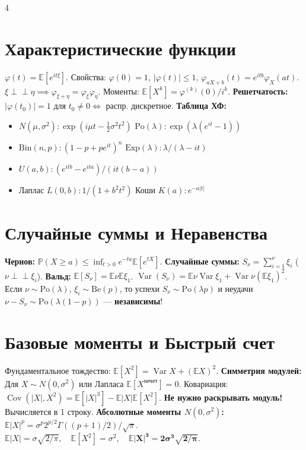 \documentclass[8pt, a4paper, landscape]{extarticle}
\newcommand{\E}{\mathbb{E}}
\renewcommand{\P}{\mathbb{P}}
\DeclareMathOperator{\Var}{Var}
\DeclareMathOperator{\Cov}{Cov}
\begin{document}
\begin{multicols*}{4}
\section*{Характеристические функции}
$\varphi(t) = \E[e^{it\xi}]$. Свойства: $\varphi(0)=1$, $|\varphi(t)| \le 1$, $\varphi_{aX+b}(t) = e^{itb}\varphi_X(at)$.
$\xi \perp\!\!\perp \eta \implies \varphi_{\xi+\eta} = \varphi_\xi \varphi_\eta$. Моменты: $\E[X^k] = \varphi^{(k)}(0) / i^k$.
\textbf{Решетчатость:} $|\varphi(t_0)|=1$ для $t_0 \ne 0 \iff$ распр. дискретное.
\textbf{Таблица ХФ:}
\begin{itemize}
    \item $N(\mu,\sigma^2): \exp(i\mu t - \frac{1}{2}\sigma^2 t^2)$ \quad $\text{Po}(\lambda): \exp(\lambda(e^{it}-1))$
    \item $\text{Bin}(n,p): (1-p+pe^{it})^n$ \quad $\text{Exp}(\lambda): \lambda / (\lambda-it)$
    \item $U(a,b): (e^{itb}-e^{ita}) / (it(b-a))$
    \item Лаплас $L(0,b): 1 / (1+b^2 t^2)$ \quad Коши $K(a): e^{-a|t|}$
\end{itemize}

\section*{Случайные суммы и Неравенства}
\textbf{Чернов:} $\P(X \ge a) \le \inf_{t>0} e^{-ta}\E[e^{tX}]$.
\textbf{Случайные суммы:} $S_\nu = \sum_{i=1}^\nu \xi_i$ ($\nu \perp\!\!\perp \xi_i$).
\textbf{Вальд:} $\E[S_\nu] \!=\! \E\nu\E\xi_1$. $\Var(S_\nu) \!=\! \E\nu\Var\xi_1 \!+\! \Var\nu(\E\xi_1)^2$.
Если $\nu \sim \text{Po}(\lambda)$, $\xi_i \sim \text{Be}(p)$, то успехи $S_\nu \sim \text{Po}(\lambda p)$ и неудачи $\nu-S_\nu \sim \text{Po}(\lambda(1-p))$ --- \textbf{независимы}!

\section*{Базовые моменты и Быстрый счет}
Фундаментальное тождество: $\E[X^2] = \Var X + (\E X)^2$. 
\textbf{Симметрия модулей:} Для $X \sim N(0, \sigma^2)$ или Лапласа $\E[X^{\text{нечет}}]=0$. Ковариация: $\Cov(|X|, X^2) = \E[|X|^3] - \E|X|\E[X^2]$. \textbf{Не нужно раскрывать модуль!} Вычисляется в 1 строку.
\textbf{Абсолютные моменты $N(0, \sigma^2)$:}
$\E|X|^p = \sigma^p 2^{p/2} \Gamma((p+1)/2)/\sqrt{\pi}$.
$\E|X| = \sigma \sqrt{2/\pi}, \quad \E[X^2]=\sigma^2, \quad \mathbf{\E|X|^3 = 2\sigma^3 \sqrt{2/\pi}}$.


\end{multicols*}
\end{document}
